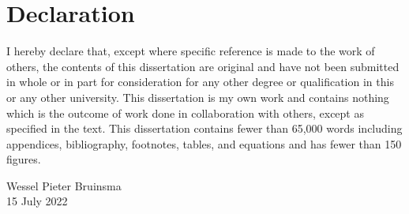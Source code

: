 \documentclass[12pt]{report}
\begin{document}
\chapter*{Declaration}

I hereby declare that, except where specific reference is made to the work of others, the contents of this dissertation are original and have not been submitted in whole or in part for consideration for any other degree or qualification in this or any other university.
This dissertation is my own work and contains nothing which is the outcome of work done in collaboration with others, except as specified in the text.
This dissertation contains fewer than 65,000 words including appendices, bibliography, footnotes, tables, and equations and has fewer than 150 figures.

\raggedleft
Wessel Pieter Bruinsma \\
15 July 2022
\end{document}
